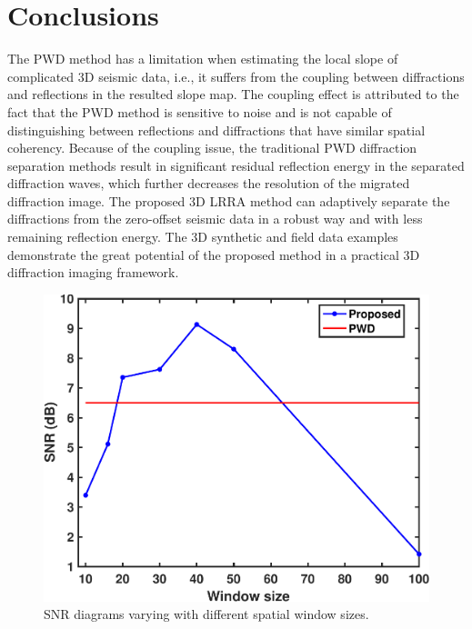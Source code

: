 \documentclass[10pt]{IEEEtran}
\begin{document}

%

\section{Conclusions}
The PWD method has a limitation when estimating the local slope of complicated 3D seismic data, i.e., it suffers from the coupling between diffractions and reflections in the resulted slope map. The coupling effect is attributed to the fact that the PWD method is sensitive to noise and is not capable of distinguishing between reflections and diffractions that have similar spatial coherency. Because of the coupling issue, the traditional PWD diffraction separation methods result in significant residual reflection energy in the separated diffraction waves, which further decreases the resolution of the migrated diffraction image. The proposed 3D LRRA method can adaptively separate the diffractions from the zero-offset seismic data in a robust way and with less remaining reflection energy. The 3D synthetic and field data examples demonstrate the great potential of the proposed method in a practical 3D diffraction imaging framework.


\begin{figure}[htb!]
\centering
\includegraphics[width=0.7\columnwidth]{Fig/curve}
\caption{SNR diagrams varying with different spatial window sizes.}
\label{fig:curve}
\end{figure}
\end{document}
